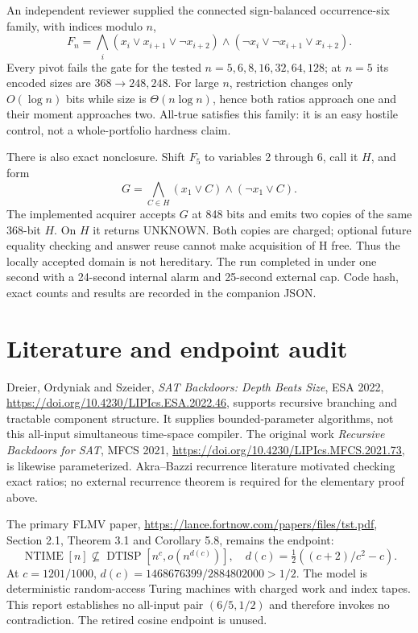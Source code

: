 \documentclass[11pt]{article}
\begin{document}
An independent reviewer supplied the connected sign-balanced occurrence-six
family, with indices modulo $n$,
\[
 F_n=\bigwedge_i(x_i\vee x_{i+1}\vee\neg x_{i+2})
 \wedge(\neg x_i\vee\neg x_{i+1}\vee x_{i+2}).
\]
Every pivot fails the gate for the tested $n=5,6,8,16,32,64,128$; at $n=5$
its encoded sizes are $368\to248,248$. For large $n$, restriction changes
only $O(\log n)$ bits while size is $\Theta(n\log n)$, hence both ratios
approach one and their moment approaches two. All-true satisfies this family:
it is an easy hostile control, not a whole-portfolio hardness claim.

There is also exact nonclosure. Shift $F_5$ to variables 2 through 6, call
it $H$, and form
\[
 G=\bigwedge_{C\in H}(x_1\vee C)\wedge(\neg x_1\vee C).
\]
The implemented acquirer accepts $G$ at 848 bits and emits two copies of the
same 368-bit $H$. On $H$ it returns UNKNOWN. Both copies are charged; optional
future equality checking and answer reuse cannot make acquisition of H free.
Thus the locally accepted domain is not hereditary. The run completed in
under one second with a 24-second internal alarm and 25-second external cap.
Code hash, exact counts and results are recorded in the companion JSON.

\section{Literature and endpoint audit}
Dreier, Ordyniak and Szeider, \emph{SAT Backdoors: Depth Beats Size}, ESA 2022,
\url{https://doi.org/10.4230/LIPIcs.ESA.2022.46}, supports recursive branching
and tractable component structure. It supplies bounded-parameter algorithms,
not this all-input simultaneous time-space compiler. The original work
\emph{Recursive Backdoors for SAT}, MFCS 2021,
\url{https://doi.org/10.4230/LIPIcs.MFCS.2021.73}, is likewise parameterized.
Akra--Bazzi recurrence literature motivated checking exact ratios; no external
recurrence theorem is required for the elementary proof above.

The primary FLMV paper, \url{https://lance.fortnow.com/papers/files/tst.pdf},
Section 2.1, Theorem 3.1 and Corollary 5.8, remains the endpoint:
\[
 \operatorname{NTIME}[n]\not\subseteq
 \operatorname{DTISP}[n^c,o(n^{d(c)})],\quad
 d(c)=\tfrac12((c+2)/c^2-c).
\]
At $c=1201/1000$, $d(c)=1468676399/2884802000>1/2$.
The model is deterministic random-access Turing machines with charged work
and index tapes. This report establishes no all-input pair $(6/5,1/2)$ and
therefore invokes no contradiction. The retired cosine endpoint is unused.
\end{document}
